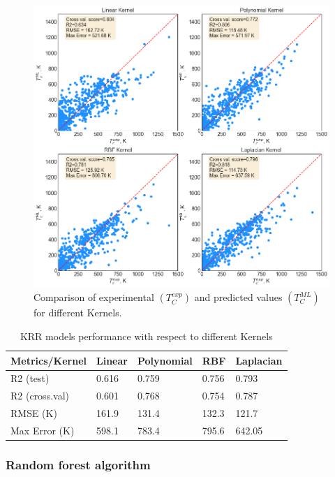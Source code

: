 \begin{figure}[H]
\centering
\captionsetup{justification=centering,margin=2cm}
	\includegraphics[width=160mm]{fig/ml_fig/krr_results.png}
	\caption[Comparison of experimental $(T_C^{exp})$ and predicted values $(T_C^{ML})$ for different Kernels.]{Comparison of experimental $(T_C^{exp})$ and predicted values $(T_C^{ML})$ for different Kernels.}
\label{fig:krr_results}
\end{figure}

\begin{table}[H]
\centering
\caption{KRR models performance with respect to different Kernels}
\begin{tabular}{|p{3cm}|p{2.5cm}|p{2.5cm}|p{2.5cm}|p{2.5cm}|}
\hline 
Metrics/Kernel & Linear & Polynomial & RBF & Laplacian \\ 
\hline 
R2 (test) & 0.616
 & 0.759 & 0.756 & 0.793 \\ 
R2 (cross.val) & 0.601 & 0.768 & 0.754 & 0.787 \\ 
RMSE (K) & 161.9 & 
131.4 & 132.3 & 121.7 \\ 
Max Error (K) & 598.1 & 783.4 & 795.6 & 642.05 \\ 
\hline 
\end{tabular} 
\label{tab:krr_results}
\end{table}

\subsubsection{Random forest algorithm}

